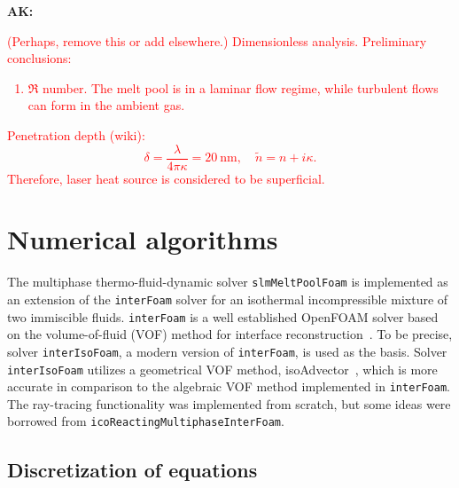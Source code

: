 \documentclass[final]{elsarticle} %
\newcommand{\OpenFOAM}{OpenFOAM\textregistered\xspace}
\newcommand{\ak}[1] {\textbf{AK:} \textcolor{red}{#1}}
\begin{document}
\ak{(Perhaps, remove this or add elsewhere.) Dimensionless analysis.
Preliminary conclusions:
\begin{enumerate}
    \item $\Re$ number. The melt pool is in a laminar flow regime, while  turbulent flows can form in the ambient gas.
\end{enumerate}
Penetration depth (wiki):
\begin{equation*}
    \delta = \frac{\lambda}{4\pi\kappa} = \SI{20}{\nm}, \quad
    \tilde{n} = n + i\kappa.
\end{equation*}
Therefore, laser heat source is considered to be superficial.}

\section{Numerical algorithms}

The multiphase thermo-fluid-dynamic solver \texttt{slmMeltPoolFoam}
is implemented as an extension of the \texttt{interFoam} solver
for an isothermal incompressible mixture of two immiscible fluids.
\texttt{interFoam} is a well established \OpenFOAM solver
based on the volume-of-fluid (VOF) method for interface reconstruction~\cite{hirt1981volume}.
To be precise, solver \texttt{interIsoFoam}, a modern version of \texttt{interFoam},
is used as the basis.
Solver \texttt{interIsoFoam} utilizes a geometrical VOF method,
isoAdvector~\cite{roenby2016computational}, which is more accurate in comparison to
the algebraic VOF method implemented in \texttt{interFoam}.
The ray-tracing functionality was implemented from scratch, but some ideas were
borrowed from \texttt{icoReactingMultiphaseInterFoam}.

\subsection{Discretization of equations}
\end{document}
